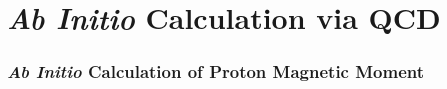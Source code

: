 \documentclass[10pt,aspectratio=43,mathserif]{beamer}
\numberwithin{equation}{section}
\begin{document}
%


\section{\textsl{Ab Initio} Calculation via QCD}
\begin{frame}
\frametitle{\textsl{Ab Initio} Calculation of Proton Magnetic Moment}

\iffalse
{
the magnetic moment of the proton differs from
that expected for a point-like Dirac fermion.\\
Since quarks are fundamental Dirac fermions, the operators for the total magnetic moment and z-component of the magnetic moment are
\begin{align}
\bm\mu = \dfrac{Q}{m}\vb{S} & \bm\mu_z = \dfrac{Q}{m}\vb{S}_z
\end{align}
thus
\begin{align}
\bm\mu_{u,z} &= \dfrac{2}{3}\dfrac{m_p}{m_u}\dfrac{1}{2} = 
\end{align}
}
\fi
\end{frame}



%
%
\end{document}
